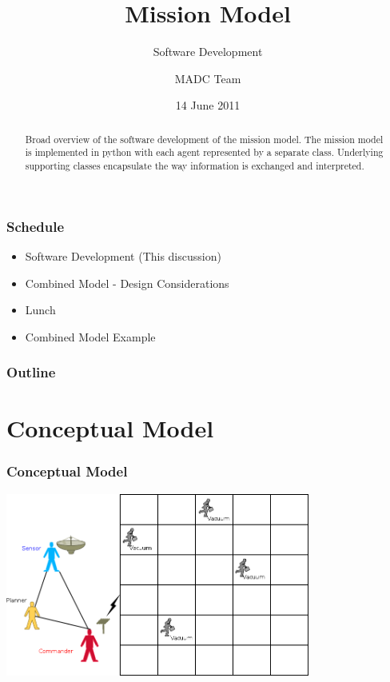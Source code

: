 \documentclass{beamer}
\begin{document}
\title{Mission Model}
\subtitle{Software Development}
\author{MADC Team}
\date{14 June 2011}

\begin{frame}
  \titlepage
  \begin{abstract}
    Broad overview of the software development of the mission
    model. The mission model is implemented in python with each agent
    represented by a separate class. Underlying supporting classes
    encapsulate the way information is exchanged and interpreted.
  \end{abstract}
\end{frame}



\begin{frame}
  \frametitle{Schedule}

  \begin{itemize}
  \item Software Development (This discussion) 
  \item Combined Model - Design Considerations
  \item Lunch
  \item Combined Model Example
  \end{itemize}

\end{frame}


\begin{frame}
  \frametitle{Outline}
\end{frame}



\section{Conceptual Model}


\begin{frame}
  \frametitle{Conceptual Model}

  \includegraphics[height=6cm]{conceptualWorld.png}

\end{frame}
\end{document}
